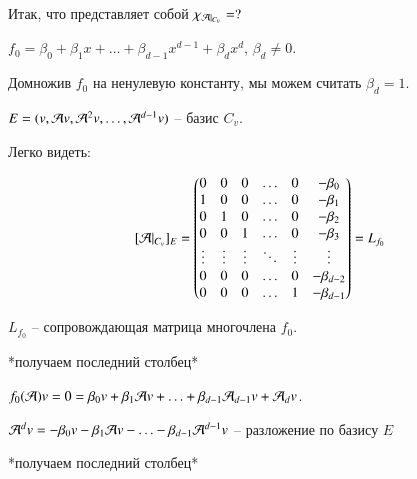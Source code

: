 \documentclass[main]{subfiles}
\begin{document}
Итак, что представляет собой $\chi_{\mathcal{A} |_{C_v}} = ?$

$f_0 = \beta_0 + \beta_1 x + \ldots + \beta_{d-1} x^{d-1} + \beta_{d} x^{d}$, $\beta_d \neq 0$.

Домножив $f_0$ на ненулевую константу, мы можем считать $\beta_d = 1$.

$E = (v, \mathcal{A} v, {\mathcal{A}}^2 v, \ldots, {\mathcal{A}}^{d-1} v)$ -- базис $C_v$.

Легко видеть:

\[[\mathcal{A} |_{C_v}]_E = \begin{pmatrix}
        0      & 0      & 0      & \ldots & 0      & -\beta_0     \\
        1      & 0      & 0      & \ldots & 0      & -\beta_1     \\
        0      & 1      & 0      & \ldots & 0      & -\beta_2     \\
        0      & 0      & 1      & \ldots & 0      & -\beta_3     \\
        \vdots & \vdots & \vdots & \ddots & \vdots & \vdots       \\
        0      & 0      & 0      & \ldots & 0      & -\beta_{d-2} \\
        0      & 0      & 0      & \ldots & 1      & -\beta_{d-1} \\
    \end{pmatrix} = L_{f_0}\]

\begin{center}
    $L_{f_0}$ -- сопровождающая матрица многочлена $f_0$.
\end{center}

\begin{center}
    *получаем последний столбец*

    $f_0(\mathcal{A}) v = 0 = \beta_0 v + \beta_1 \mathcal{A} v + \ldots + \beta_{d-1} \mathcal{A}_{d-1} v + \mathcal{A}_d v$.

    ${\mathcal{A}}^d v = -\beta_0 v - \beta_1 \mathcal{A} v - \ldots - \beta_{d-1} {\mathcal{A}}^{d-1} v$ -- разложение по базису $E$

    *получаем последний столбец*
\end{center}
\end{document}
